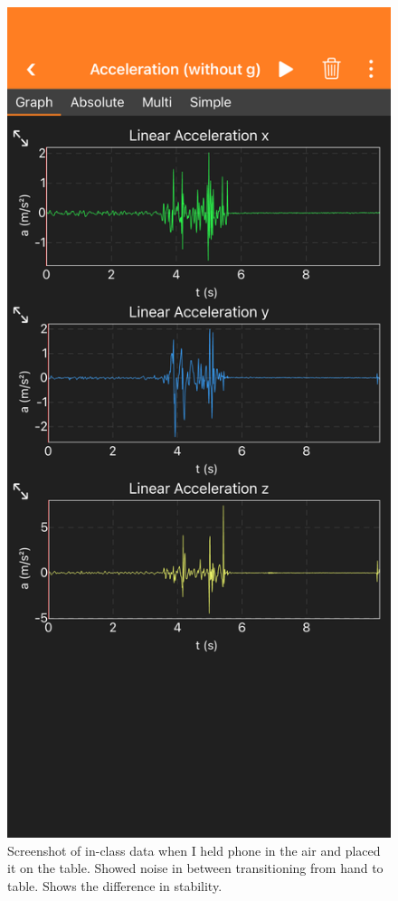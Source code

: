 \documentclass[idxtotoc,hyperref,openany]{labbook} %
\begin{document}
\begin{figure}[H] %
\begin{center}
\includegraphics[width=.70\linewidth]{images/Lab.04/Lab04InClass.PNG}
\end{center}
\caption{Screenshot of in-class data when I held phone in the air and placed it on the table. Showed noise in between transitioning from hand to table. Shows the difference in stability.}
\label{fig:Lab04-InClassDataHandToTable}
\end{figure}
\end{document}
